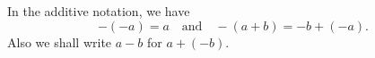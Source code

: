 In the additive notation, we have
$$-(-a) = a \quad \text{and} \quad -(a + b) = -b + (-a).$$
Also we shall write $a - b$ for $a + (-b)$.
